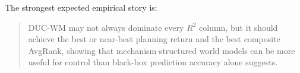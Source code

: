 \documentclass[11pt]{article}
\begin{document}
The strongest expected empirical story is:
\begin{quote}
DUC-WM may not always dominate every $R^2$ column, but it should achieve the best or near-best planning return and the best composite AvgRank, showing that mechanism-structured world models can be more useful for control than black-box prediction accuracy alone suggests.
\end{quote}
\end{document}
